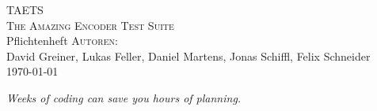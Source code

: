\documentclass[a4paper]{article}
\begin{document}

\begin{titlepage}
\begin{center}
\vspace*{2.5cm}
{\Huge TAETS}\\[1.5cm]
{\LARGE \textsc{The Amazing Encoder Test Suite}}\\[1.0cm]
{\large Pflichtenheft}
\vfill
\textsc{Autoren:}\\
David Greiner, Lukas Feller, Daniel Martens, Jonas Schiffl, Felix Schneider\\[0.5cm]
\today
\end{center}
\end{titlepage}

\vspace*{\fill}
\begin{center}
\textit{Weeks of coding can save you hours of planning.}
\end{center}
\vspace*{\fill}
\newpage

\tableofcontents
\newpage
























\end{document}
